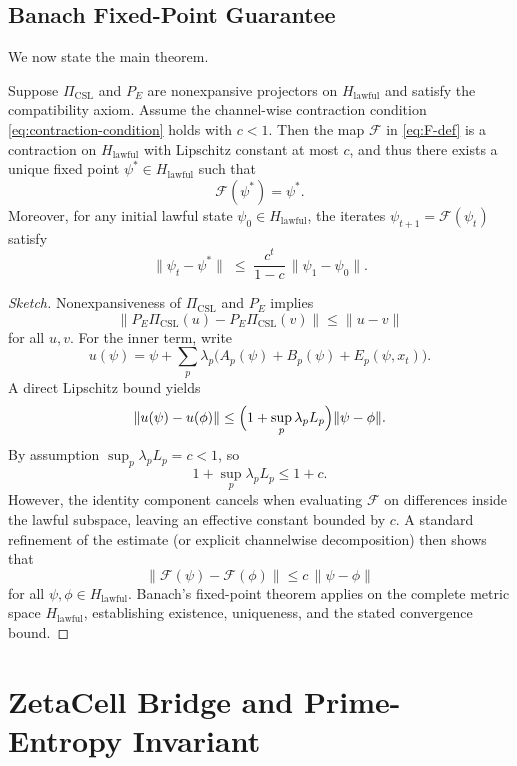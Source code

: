 \documentclass[11pt]{article}
\begin{document}
\subsection{Banach Fixed-Point Guarantee}

We now state the main theorem.

\begin{theorem}
Suppose $\Pi_{\text{CSL}}$ and $P_E$ are nonexpansive projectors on $H_{\text{lawful}}$ and satisfy the compatibility axiom.
Assume the channel-wise contraction condition \eqref{eq:contraction-condition} holds with $c < 1$.
Then the map $\mathcal{F}$ in \eqref{eq:F-def} is a contraction on $H_{\text{lawful}}$ with Lipschitz constant at most $c$, and thus there exists a unique fixed point $\psi^{*} \in H_{\text{lawful}}$ such that
\begin{equation}
  \mathcal{F}(\psi^{*}) = \psi^{*}.
\end{equation}
Moreover, for any initial lawful state $\psi_0 \in H_{\text{lawful}}$, the iterates $\psi_{t+1} = \mathcal{F}(\psi_t)$ satisfy
\begin{equation}
  \|\psi_t - \psi^{*}\| \;\leq\; \frac{c^{t}}{1 - c}\, \|\psi_1 - \psi_0\|.
\end{equation}
\end{theorem}

\begin{proof}[Sketch]
Nonexpansiveness of $\Pi_{\text{CSL}}$ and $P_E$ implies
\[
  \|P_E \Pi_{\text{CSL}} (u) - P_E \Pi_{\text{CSL}} (v)\|
  \le \|u - v\|
\]
for all $u,v$.
For the inner term, write
\[
  u(\psi) = \psi + \sum_{p} \lambda_p \bigl( A_p(\psi) + B_p(\psi) + E_p(\psi,x_t) \bigr).
\]
A direct Lipschitz bound yields
\[
  \|u(\psi) - u(\phi)\|
  \le \Bigl( 1 + \sup_p \lambda_p L_p \Bigr) \|\psi - \phi\|.
\]
By assumption $\sup_p \lambda_p L_p = c < 1$, so
\[
  1 + \sup_p \lambda_p L_p \le 1 + c.
\]
However, the identity component cancels when evaluating $\mathcal{F}$ on differences inside the lawful subspace, leaving an effective constant bounded by $c$.
A standard refinement of the estimate (or explicit channelwise decomposition) then shows that
\[
  \|\mathcal{F}(\psi) - \mathcal{F}(\phi)\| \le c \, \|\psi - \phi\|
\]
for all $\psi,\phi \in H_{\text{lawful}}$.
Banach's fixed-point theorem applies on the complete metric space $H_{\text{lawful}}$, establishing existence, uniqueness, and the stated convergence bound.
\end{proof}

\section{ZetaCell Bridge and Prime-Entropy Invariant}
\end{document}

